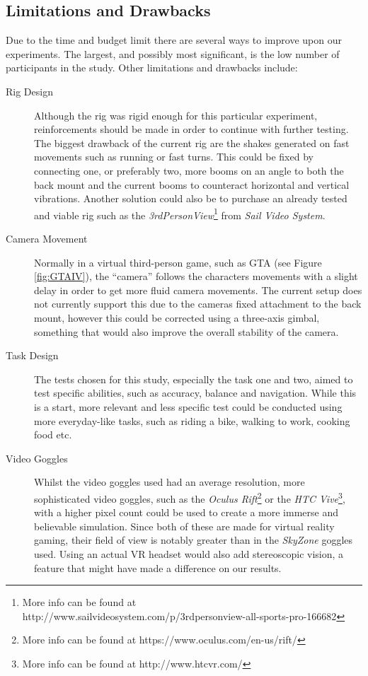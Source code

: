\documentclass[runningheads,a4paper,oribibl]{llncs}
\begin{document}
\subsection{Limitations and Drawbacks}
Due to the time and budget limit there are several ways to improve upon our experiments. The largest, and possibly most significant, is the low number of participants in the study. Other limitations and drawbacks include:
\begin{description}
	\item[Rig Design] Although the rig was rigid enough for this particular experiment, reinforcements should be made in order to continue with further testing. The biggest drawback of the current rig are the shakes generated on fast movements such as running or fast turns. This could be fixed by connecting one, or preferably two, more booms on an angle to both the back mount and the current booms to counteract horizontal and vertical vibrations. Another solution could also be to purchase an already tested and viable rig such as the \emph{3rdPersonView}\footnote{More info can be found at http://www.sailvideosystem.com/p/3rdpersonview-all-sports-pro-166682} from \emph{Sail Video System}.

	\item[Camera Movement] Normally in a virtual third-person game, such as GTA (see Figure \ref{fig:GTAIV}), the ``camera'' follows the characters movements with a slight delay in order to get more fluid camera movements. The current setup does not currently support this due to the cameras fixed attachment to the back mount, however this could be corrected using a three-axis gimbal, something that would also improve the overall stability of the camera.

	\item[Task Design] The tests chosen for this study, especially the task one and two, aimed to test specific abilities, such as accuracy, balance and navigation. While this is a start, more relevant and less specific test could be conducted using more everyday-like tasks, such as riding a bike, walking to work, cooking food etc.

	\item[Video Goggles] Whilst the video goggles used had an average resolution, more sophisticated video goggles, such as the \emph{Oculus Rift}\footnote{More info can be found at https://www.oculus.com/en-us/rift/} or the \emph{HTC Vive}\footnote{More info can be found at http://www.htcvr.com/}, with a higher pixel count could be used to create a more immerse and believable simulation. Since both of these are made for virtual reality gaming, their field of view is notably greater than in the \emph{SkyZone} goggles used. Using an actual VR headset would also add stereoscopic vision, a feature that might have made a difference on our results.


\end{description}
\end{document}

